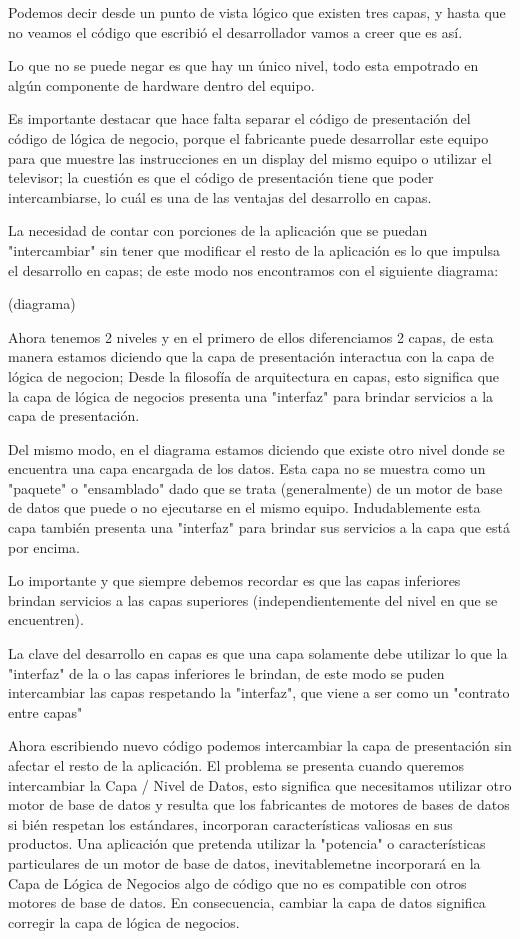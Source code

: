 Podemos decir desde un punto de vista lógico que existen tres capas, y hasta que no veamos el código que escribió el desarrollador vamos
a creer que es así.

Lo que no se puede negar es que hay un único nivel, todo esta empotrado en algún componente de hardware dentro del equipo.

Es importante destacar que hace falta separar el código de presentación del código de lógica de negocio, porque el fabricante puede 
desarrollar este equipo para que muestre las instrucciones en un display del mismo equipo o utilizar el televisor; la cuestión es que 
el código de presentación tiene que poder intercambiarse, lo cuál es una de las ventajas del desarrollo en capas.

La necesidad de contar con porciones de la aplicación que se puedan "intercambiar" sin tener que modificar el resto de la aplicación es lo 
que impulsa el desarrollo en capas; de este modo nos encontramos con el siguiente diagrama:

(diagrama)

Ahora tenemos 2 niveles y en el primero de ellos diferenciamos 2 capas, de esta manera estamos diciendo que la capa de presentación 
interactua con la capa de lógica de negocion; Desde la filosofía de arquitectura en capas, esto significa que la capa de lógica de negocios 
presenta una "interfaz" para brindar servicios a la capa de presentación.

Del mismo modo, en el diagrama estamos diciendo que existe otro nivel donde se encuentra una capa encargada de los datos. Esta capa no se 
muestra como un "paquete" o "ensamblado" dado que se trata (generalmente) de un motor de base de datos que puede o no ejecutarse en el mismo 
equipo. Indudablemente esta capa también presenta una "interfaz" para brindar sus servicios a la capa que está por encima.

Lo importante y que siempre debemos recordar es que las capas inferiores brindan servicios a las capas superiores (independientemente 
del nivel en que se encuentren).

La clave del desarrollo en capas es que una capa solamente debe utilizar lo que la "interfaz" de la o las capas inferiores le brindan, 
de este modo se puden intercambiar las capas respetando la "interfaz", que viene a ser como un "contrato entre capas"

Ahora escribiendo nuevo código podemos intercambiar la capa de presentación sin afectar el resto de la aplicación. El problema 
se presenta cuando queremos intercambiar la Capa / Nivel de Datos, esto significa que necesitamos utilizar otro motor de base de datos y 
resulta que los fabricantes de motores de bases de datos si bién respetan los estándares, incorporan características valiosas en 
sus productos. Una aplicación que pretenda utilizar la "potencia" o características particulares de un motor de base de datos, 
inevitablemetne incorporará en la Capa de Lógica de Negocios algo de código que no es compatible con otros motores de base de datos. 
En consecuencia, cambiar la capa de datos significa corregir la capa de lógica de negocios.

